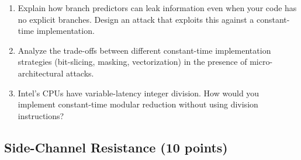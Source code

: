 \documentclass[10pt,a4paper,american]{article}
\begin{document}
\begin{enumerate}
	      \begin{enumerate}
		      \item Explain how branch predictors can leak information even when your code has no explicit branches. Design an attack that exploits this against a constant-time implementation.
		      \item Analyze the trade-offs between different constant-time implementation strategies (bit-slicing, masking, vectorization) in the presence of micro-architectural attacks.
		      \item Intel's CPUs have variable-latency integer division. How would you implement constant-time modular reduction without using division instructions?
	      \end{enumerate}
\end{enumerate}

\subsection{Side-Channel Resistance (10 points)}
\end{document}
